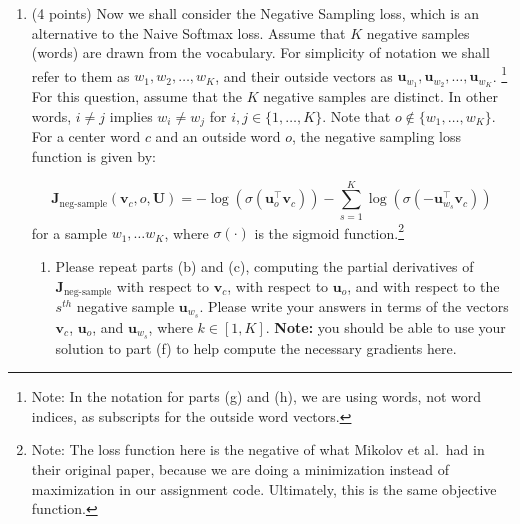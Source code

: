 \documentclass{article}
\begin{document}
\begin{enumerate}
        \item (4 points) Now we shall consider the Negative Sampling loss, which is an alternative to the Naive Softmax loss. Assume that $K$ negative samples (words) are drawn from the vocabulary. For simplicity of notation we shall refer to them as $w_1, w_2, \dots, w_K$, and their outside vectors as $\bm u_{w_1}, \bm u_{w_2}, \dots, \bm u_{w_K}$. \footnote{Note: In the notation for parts (g) and (h), we are using words, not word indices, as subscripts for the outside word vectors.} For this question, assume that the $K$ negative samples are distinct. In other words, $i\neq j$ implies $w_i\neq w_j$ for $i,j\in\{1,\dots,K\}$.
        Note that $o\notin\{w_1, \dots, w_K\}$.
        For a center word $c$ and an outside word $o$, the negative sampling loss function is given by:

        \begin{equation}
            \bm J_{\text{neg-sample}}(\bm v_c, o, \bm U) = -\log(\sigma(\bm u_o^\top \bm v_c)) - \sum_{s=1}^K \log(\sigma(-\bm u_{w_s}^\top \bm v_c))
        \end{equation}
        for a sample $w_1, \ldots w_K$, where $\sigma(\cdot)$ is the sigmoid function.\footnote{Note: The loss function here is the negative of what Mikolov et al.\ had in their original paper, because we are doing a minimization instead of maximization in our assignment code. Ultimately, this is the same objective function.}

        \begin{enumerate}
            [label=(\roman*)]
            \item Please repeat parts (b) and (c), computing the partial derivatives of $\bm J_{\text{neg-sample}}$ with respect to $\bm v_c$, with respect to $\bm u_o$, and with respect to the $s^{th}$ negative sample $\bm u_{w_s}$. Please write your answers in terms of the vectors $\bm v_c$, $\bm u_o$, and $\bm u_{w_s}$, where $k \in [1, K]$. \textbf{Note:} you should be able to use your solution to part (f) to help compute the necessary gradients here.


\end{enumerate}
\end{enumerate}
\end{document}
